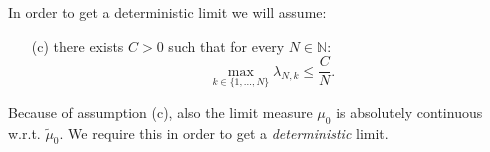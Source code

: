 \documentclass[a4paper,twoside,11pt]{article}
\theoremstyle{plain}
\theoremstyle{definition}
\theoremstyle{remark}
\newcommand\N{\mathbb N}         %
\begin{document}
%
%
%
In order to get a deterministic limit we will assume:
\begin{itemize}
\item[(c)] there exists $C>0$ such that for every $N\in\N:$
\begin{equation}\label{max}
\max_{k\in\{1,...,N\}} \lambda_{N,k} \leq \frac{C}{N}.
 \end{equation}
\end{itemize}
Because of assumption (c), also the limit measure $\mu_0$ is absolutely continuous w.r.t. $\tilde{\mu}_0.$ We require this in order to get a \emph{deterministic} limit.\\
\end{document}
